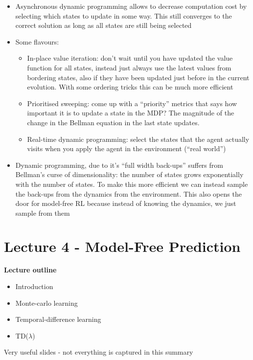 \documentclass{article}
\begin{document}
\begin{itemize}
    \item Asynchronous dynamic programming allows to decrease computation cost by selecting which states to update in some way. This still converges to the correct solution as long as all states are still being selected
    \item Some flavours:
    \begin{itemize}
        \item In-place value iteration: don't wait until you have updated the value function for all states, instead just always use the latest values from bordering states, also if they have been updated just before in the current evolution. With some ordering tricks this can be much more efficient
        \item Prioritised sweeping: come up with a ``priority'' metrics that says how important it is to update a state in the MDP? The magnitude of the change in the Bellman equation in the last state updates.
        \item Real-time dynamic programming: select the states that the agent actually visits when you apply the agent in the environment (``real world'')
    \end{itemize}
    \item Dynamic programming, due to it's ``full width back-ups'' suffers from Bellman's curse of dimensionality: the number of states grows exponentially with the number of states. To make this more efficient we can instead sample the back-ups from the dynamics from the environment. This also opens the door for model-free RL because instead of knowing the dynamics, we just sample from them
\end{itemize}

\section{Lecture 4 - Model-Free Prediction}

\textbf{Lecture outline}

\begin{itemize}
    \item Introduction
    \item Monte-carlo learning
    \item Temporal-difference learning
    \item TD($\lambda$)
\end{itemize}

Very useful slides - not everything is captured in this summary
\end{document}

